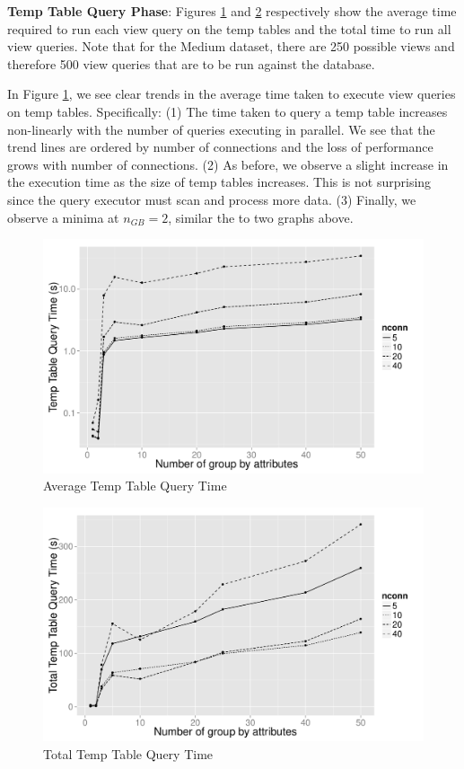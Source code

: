 {\bf Temp Table Query Phase}: Figures \ref{fig:avg_tt_query_time} and
\ref{fig:total_tt_query_time} respectively show the average time required to run
each view query on the temp tables and the total time to run all view queries.
Note that for the Medium dataset, there are 250 possible views and therefore 500
view queries that are to be run against the database.

In Figure \ref{fig:avg_tt_query_time}, we see clear trends in  the average time
taken to execute view queries on temp tables. Specifically: (1) The time taken
to query a temp table increases non-linearly with the number of queries
executing in parallel. We see that the trend lines are ordered by number of
connections and the loss of performance grows with number of connections. (2) As
before, we observe a slight increase in the execution time as the size of temp
tables increases. This is not surprising since the query executor must scan and
process more data. (3) Finally, we observe a minima at $n_{GB}=2$, similar the to
two graphs above.


\begin{figure}[h]
  \centering
    \includegraphics[width=12cm]{Images/mult_gb_tt_query_single.pdf}
  \caption{Average Temp Table Query Time}
  \label{fig:avg_tt_query_time}
\end{figure}

\begin{figure}[h]
  \centering
    \includegraphics[width=12cm]{Images/mult_gb_tt_query_total.pdf}
     \caption{Total Temp Table Query Time} 
       \label{fig:total_tt_query_time}
\end{figure}

